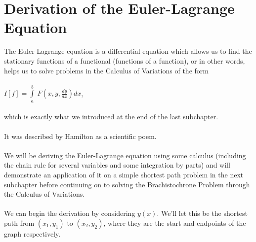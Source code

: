 \documentclass[12pt]{report}
\begin{document}
\section{Derivation of the Euler-Lagrange Equation}
The Euler-Lagrange equation is a differential equation which allows us to find the stationary functions of a functional (functions of a function), or in other words, helps us to solve problems in the Calculus of Variations of the form
\\
\\
\(I[f] = \int\limits_a^b\ F(x, y, \frac{dy}{dx})dx\), 
\\
\\
which is exactly what we introduced at the end of the last subchapter.
\\
\\
It was described by Hamilton as a scientific poem.
\\
\\
We will be deriving the Euler-Lagrange equation using some calculus (including the chain rule for several variables and some integration by parts) and will demonstrate an application of it on a simple shortest path problem in the next subchapter before continuing on to solving the Brachistochrone Problem through the Calculus of Variations.
\\
\\
We can begin the derivation by considering \(y(x)\). We'll let this be the shortest path from \((x_{1}, y_{1})\) to \((x_{2}, y_{2})\), where they are the start and endpoints of the graph respectively.
\\
\\
\end{document}
